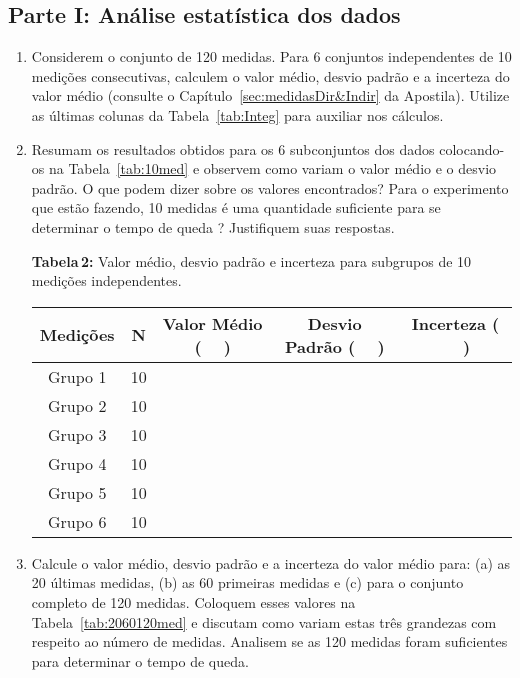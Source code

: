 \subsection*{Parte I: Análise estatística dos dados}

\begin{enumerate}
\item Considerem o conjunto de 120 medidas. Para 6 conjuntos independentes de 10 medições consecutivas, calculem o valor médio, desvio padrão e a incerteza do valor médio (consulte o Capítulo~\ref{sec:medidasDir&Indir}  da Apostila). Utilize as últimas colunas da Tabela~\ref{tab:Integ} para auxiliar nos cálculos.

\item Resumam os resultados obtidos para os 6 subconjuntos dos dados colocando-os na Tabela~\ref{tab:10med} e observem como variam o valor médio e o desvio padrão. O que podem dizer sobre os valores encontrados? Para o experimento que estão fazendo, 10 medidas é uma quantidade suficiente para se determinar o tempo de queda ? Justifiquem suas respostas. 

\renewcommand{\arraystretch}{1.5}
\begin{center}
{{\bf Tabela\,2:} Valor médio, desvio padrão e incerteza para subgrupos de 10 medições independentes.} 
  \begin{tabular}{|c|c|c|c|c|} \hline
  \bf Medições & \bf N & \bf Valor Médio ($\;\;\;\;\;$) & \bf Desvio Padrão ($\;\;\;\;\;$) & \bf Incerteza ($\;\;\;\;\;$) \\ \hline
  Grupo 1 & 10 & & & \\ \hline
  Grupo 2 & 10 & & & \\ \hline
  Grupo 3 & 10 & & & \\ \hline
  Grupo 4 & 10 & & & \\ \hline
  Grupo 5 & 10 & & & \\ \hline
  Grupo 6 & 10 & & & \\ \hline
  \end{tabular}
  \label{tab:10med}
\end{center}

\item Calcule o valor médio, desvio padrão e a incerteza do valor médio para: (a) as 20 últimas medidas, (b) as 60 primeiras medidas e (c) para o conjunto completo de 120 medidas. Coloquem esses valores na Tabela~\ref{tab:2060120med} e discutam como  variam estas três grandezas com respeito ao número de medidas. Analisem se as 120 medidas foram suficientes para determinar o tempo de queda. 


\end{enumerate}
